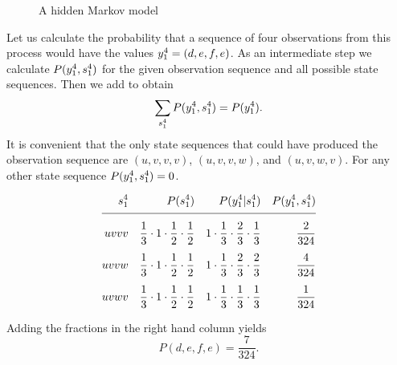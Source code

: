 \begin{figure}[htbp]
  \centering{\plotsize%
    }
  \caption[A hidden Markov model.]{A hidden Markov model}
  \label{fig:dhmm}
\end{figure}

Let us calculate the probability that a sequence of four observations
from this process would have the values $y_{1}^{4} = (d,e,f,e)$.
As an intermediate step we calculate $P(y_{1}^{4},s_{1}^{4})$
for the given observation sequence and all possible state sequences.
Then we add to obtain
\begin{equation}
  \label{eq:dhmm_sum}
  \sum_{s_{1}^{4}} P(y_{1}^{4},s_{1}^{4}) = P(y_{1}^{4}).
\end{equation}
It is convenient that the only state sequences that could have
produced the observation sequence are $(u,v,v,v)$, $(u,v,v,w)$, and
$(u,v,w,v)$.  For any other state sequence
$P(y_{1}^{4},s_{1}^{4}) = 0$.

\begin{subequations}
\label{eq:pcalc}
 \begin{align}
  \ts{s}{1}{4} & & P(\ts{s}{1}{4}) %
                & & P(\ts{y}{1}{4}|\ts{s}{1}{4}) %
                 & & P(\ts{y}{1}{4},\ts{s}{1}{4})\nonumber\\[1ex]
  \hline\nonumber\\[-2ex]
  uvvv         & & \frac{1}{3} \cdot 1 \cdot \frac{1}{2} \cdot \frac{1}{2} %
                & & 1 \cdot \frac{1}{3} \cdot \frac{2}{3} \cdot \frac{1}{3} %
                 & & \frac{2}{324}\\[1ex]
  uvvw         & & \frac{1}{3} \cdot 1 \cdot \frac{1}{2} \cdot \frac{1}{2} %
                & & 1 \cdot \frac{1}{3} \cdot \frac{2}{3} \cdot \frac{2}{3} %
                 & & \frac{4}{324}\\[1ex]
  uvwv         & & \frac{1}{3} \cdot 1 \cdot \frac{1}{2} \cdot \frac{1}{2} %
                & & 1 \cdot \frac{1}{3} \cdot \frac{1}{3} \cdot \frac{1}{3} %
                 & & \frac{1}{324}
 \end{align}
\end{subequations}

Adding the fractions in the right hand column yields %
\begin{equation*}
  P(d,e,f,e) = \frac{7}{324}.
\end{equation*}

